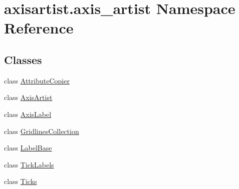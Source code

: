 \hypertarget{namespaceaxisartist_1_1axis__artist}{}\section{axisartist.\+axis\+\_\+artist Namespace Reference}
\label{namespaceaxisartist_1_1axis__artist}
\subsection*{Classes}
\begin{DoxyCompactItemize}
\item 
class \hyperlink{classaxisartist_1_1axis__artist_1_1AttributeCopier}{Attribute\+Copier}
\item 
class \hyperlink{classaxisartist_1_1axis__artist_1_1AxisArtist}{Axis\+Artist}
\item 
class \hyperlink{classaxisartist_1_1axis__artist_1_1AxisLabel}{Axis\+Label}
\item 
class \hyperlink{classaxisartist_1_1axis__artist_1_1GridlinesCollection}{Gridlines\+Collection}
\item 
class \hyperlink{classaxisartist_1_1axis__artist_1_1LabelBase}{Label\+Base}
\item 
class \hyperlink{classaxisartist_1_1axis__artist_1_1TickLabels}{Tick\+Labels}
\item 
class \hyperlink{classaxisartist_1_1axis__artist_1_1Ticks}{Ticks}
\end{DoxyCompactItemize}
